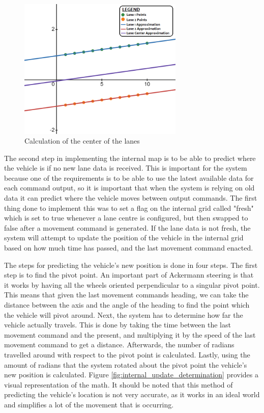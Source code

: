 \documentclass[titlepage, draft]{article}
\begin{document}
{\begin{figure}
	\centering
	\includegraphics[width=0.7\textwidth]{lane_center}
	\caption{Calculation of the center of the lanes}
	\label{fig:lane_center_determination}
\end{figure}

The second step in implementing the internal map is to be able to predict where the vehicle is if no new lane data is received. This is important for the system because one of the requirements is to be able to use the latest available data for each command output, so it is important that when the system is relying on old data it can predict where the vehicle moves between output commands. The first thing done to implement this was to set a flag on the internal grid called "fresh" which is set to true whenever a lane centre is configured, but then swapped to false after a movement command is generated. If the lane data is not fresh, the system will attempt to update the position of the vehicle in the internal grid based on how much time has passed, and the last movement command enacted.

The steps for predicting the vehicle's new position is done in four steps. The first step is to find the pivot point. An important part of Ackermann steering is that it works by having all the wheels oriented perpendicular to a singular pivot point. This means that given the last movement commands heading, we can take the distance between the axis and the angle of the heading to find the point which the vehicle will pivot around. Next, the system has to determine how far the vehicle actually travels. This is done by taking the time between the last movement command and the present, and multiplying it by the speed of the last movement command to get a distance. Afterwards, the number of radians travelled around with respect to the pivot point is calculated. Lastly, using the amount of radians that the system rotated about the pivot point the vehicle's new position is calculated. Figure \ref{fig:internal_update_determination} provides a visual representation of the math. It should be noted that this method of predicting the vehicle's location is not very accurate, as it works in an ideal world and simplifies a lot of the movement that is occurring.

}
\end{document}
